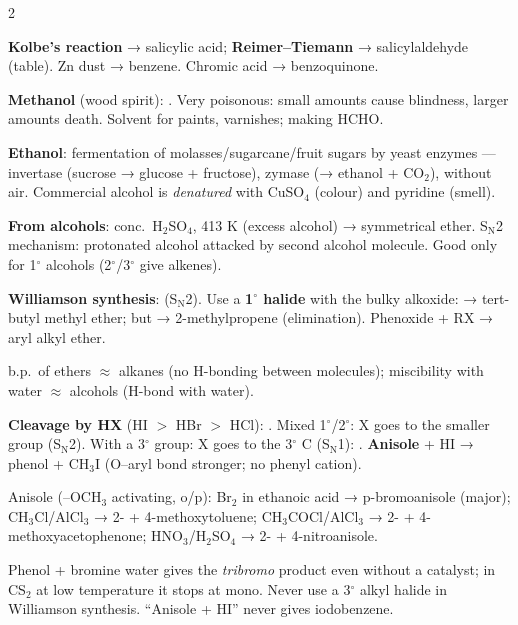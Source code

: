 \documentclass[9pt,a4paper]{extarticle}
\newcommand{\nr}[1]{\textbf{\color{uc!85!black}#1}}
\begin{document}
\begin{multicols}{2}
\begin{fl}
\item \nr{Kolbe's reaction} → salicylic acid; \nr{Reimer--Tiemann} → salicylaldehyde (table). Zn dust → benzene. Chromic acid → benzoquinone.
\end{fl}
\begin{fl}
\item \textbf{Methanol} (wood spirit): . Very poisonous: small amounts cause blindness, larger amounts death. Solvent for paints, varnishes; making HCHO.
\item \textbf{Ethanol}: fermentation of molasses/sugarcane/fruit sugars by yeast enzymes — invertase (sucrose → glucose + fructose), zymase (→ ethanol + CO$_2$), without air. Commercial alcohol is \emph{denatured} with CuSO$_4$ (colour) and pyridine (smell).
\end{fl}
\begin{fl}
\item \textbf{From alcohols}: conc.\ H$_2$SO$_4$, 413 K (excess alcohol) → symmetrical ether. S$_\text{N}$2 mechanism: protonated alcohol attacked by second alcohol molecule. Good only for 1$^\circ$ alcohols (2$^\circ$/3$^\circ$ give alkenes).
\item \nr{Williamson synthesis}:  (S$_\text{N}$2). Use a \textbf{1$^\circ$ halide} with the bulky alkoxide:  → tert-butyl methyl ether; but  → 2-methylpropene (elimination). Phenoxide + RX → aryl alkyl ether.
\item b.p.\ of ethers $\approx$ alkanes (no H-bonding between molecules); miscibility with water $\approx$ alcohols (H-bond with water).
\item \textbf{Cleavage by HX} (HI $>$ HBr $>$ HCl): . Mixed 1$^\circ$/2$^\circ$: X goes to the smaller group (S$_\text{N}$2). With a 3$^\circ$ group: X goes to the 3$^\circ$ C (S$_\text{N}$1): . \textbf{Anisole} + HI → phenol + CH$_3$I (O--aryl bond stronger; no phenyl cation).
\item Anisole (--OCH$_3$ activating, o/p): Br$_2$ in ethanoic acid → p-bromoanisole (major); CH$_3$Cl/AlCl$_3$ → 2- + 4-methoxytoluene; CH$_3$COCl/AlCl$_3$ → 2- + 4-methoxyacetophenone; HNO$_3$/H$_2$SO$_4$ → 2- + 4-nitroanisole.
\end{fl}
\begin{tip}\Tip Phenol + bromine water gives the \emph{tribromo} product even without a catalyst; in CS$_2$ at low temperature it stops at mono. Never use a 3$^\circ$ alkyl halide in Williamson synthesis. ``Anisole + HI'' never gives iodobenzene.\end{tip}


\end{multicols}
\end{document}
